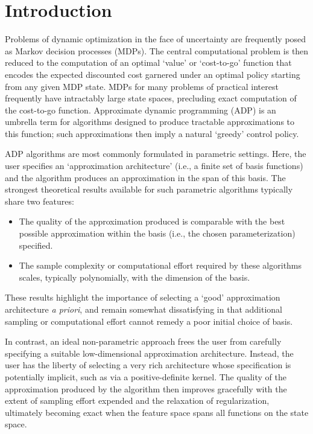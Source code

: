 \documentclass[11pt,letterpaper]{article}
\theoremstyle{definition}
\begin{document}
\tableofcontents
\bigskip

\section{Introduction}
\label{sec:intro}

Problems of dynamic optimization in the face of uncertainty are frequently posed as Markov decision processes (MDPs). The central computational problem is then reduced to the computation of an optimal `value' or `cost-to-go' function that encodes the expected discounted cost garnered under an optimal policy starting from any given MDP state. MDPs for many problems of practical interest frequently have intractably large state spaces, precluding exact computation of the cost-to-go function. Approximate dynamic programming (ADP) is an umbrella term for algorithms designed to produce tractable approximations to this function; such approximations then imply a natural `greedy' control policy.

ADP algorithms are most commonly formulated in parametric settings. Here, the user specifies an `approximation architecture' (i.e., a finite set of basis functions) and the algorithm produces an approximation in the span of this basis. The strongest theoretical results available for such parametric algorithms typically share two features:
\begin{itemize}[leftmargin=2em,itemsep=2pt]
  \item The quality of the approximation produced is comparable with the best possible approximation within the basis (i.e., the chosen parameterization) specified.
  \item The sample complexity or computational effort required by these algorithms scales, typically polynomially, with the dimension of the basis.
\end{itemize}
These results highlight the importance of selecting a `good' approximation architecture \emph{a priori}, and remain somewhat dissatisfying in that additional sampling or computational effort cannot remedy a poor initial choice of basis.

In contrast, an ideal non-parametric approach frees the user from carefully specifying a suitable low-dimensional approximation architecture. Instead, the user has the liberty of selecting a very rich architecture whose specification is potentially implicit, such as via a positive-definite kernel. The quality of the approximation produced by the algorithm then improves gracefully with the extent of sampling effort expended and the relaxation of regularization, ultimately becoming exact when the feature space spans all functions on the state space.
\end{document}
